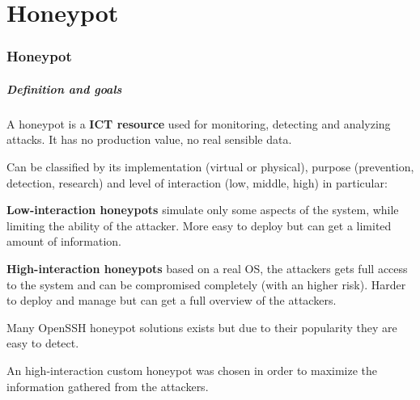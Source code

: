 \part{Honeypot}
\section{Honeypot}

\begin{frame}
	\partpage
\end{frame}

\begin{frame}
	\frametitle{Definition and goals}
	
	A honeypot is a \textbf{ICT resource} used for monitoring, detecting and analyzing attacks. It has no production value, no real sensible data. 
	
	\smallskip

	Can be classified by its implementation (virtual or physical), purpose (prevention, detection, research) and level of interaction (low, middle, high) in particular:
	
	\medskip

	\textbf{Low-interaction honeypots} simulate only some aspects of the system, while limiting the ability of the attacker. More easy to deploy but can get a limited amount of information.
	
	\medskip
	
	\textbf{High-interaction honeypots} based on a real OS, the attackers gets full access to the system and can be compromised completely (with an higher risk). Harder to deploy and manage but can get a full overview of the attackers.
	
	\medskip

  Many OpenSSH honeypot solutions exists but due to their popularity they are easy to detect.
  
	\smallskip

  An high-interaction custom honeypot was chosen in order to maximize the information gathered from the attackers.
  	
\end{frame}


